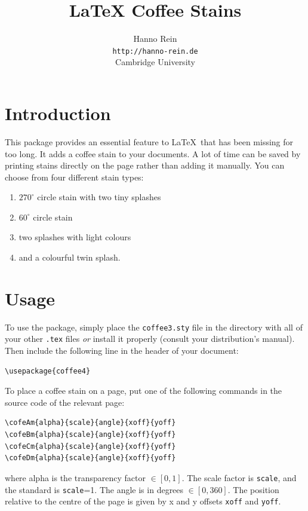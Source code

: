 \documentclass{article}
\begin{document}
\title{LaTeX Coffee Stains}
\author{Hanno Rein\\
\texttt{http://hanno-rein.de}\\
Cambridge University}
\renewcommand{\today}{April 3, 2009}
\maketitle

 
\section{Introduction}
This package provides an essential feature to \LaTeX~that has been missing for too long. It adds a coffee stain to your documents. A lot of time can be saved by printing stains directly on the page rather than adding it manually. You can choose from four different stain types:
\begin{enumerate}
  \item $270^\circ$ circle stain with two tiny splashes 
  \item $60^\circ$ circle stain 
  \item two splashes with light colours
  \item and a colourful twin splash.
\end{enumerate}




\section{Usage}
To use the package, simply place the \texttt{coffee3.sty} file in the directory with all of your 
other \texttt{.tex} files \textit{or} install it properly (consult your distribution's manual). 
Then include the following line in the header of your document:
\begin{verbatim}
\usepackage{coffee4}
\end{verbatim}
To place a coffee stain on a page, put one of the following commands in the source code of the relevant page: 
\begin{verbatim}
\cofeAm{alpha}{scale}{angle}{xoff}{yoff}
\cofeBm{alpha}{scale}{angle}{xoff}{yoff}
\cofeCm{alpha}{scale}{angle}{xoff}{yoff}
\cofeDm{alpha}{scale}{angle}{xoff}{yoff}
\end{verbatim}
where alpha is the transparency factor $\in [0,1]$. The scale factor is {\tt scale}, and the standard is {\tt scale}=1. 
The angle is in degrees $\in [0,360]$. 
The position relative to the centre of the page is given by x and y offsets \texttt{xoff} and \texttt{yoff}.
\end{document}
